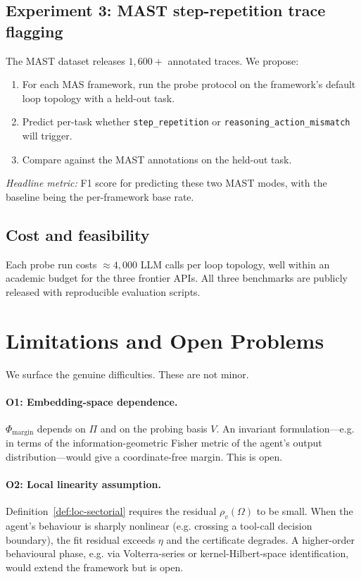 \documentclass[11pt,a4paper]{article}
\theoremstyle{definition}
\theoremstyle{remark}
\newcommand{\PhaseMargin}{\Phi_{\mathrm{margin}}}
\begin{document}
\subsection{Experiment 3: MAST step-repetition trace flagging}\label{ssec:exp-mast}

The MAST dataset \citep{Cemri2025MAST} releases $1{,}600+$ annotated traces.
We propose:
\begin{enumerate}[leftmargin=*]
\item For each MAS framework, run the probe protocol on the framework's
default loop topology with a held-out task.
\item Predict per-task whether \texttt{step\_repetition} or
\texttt{reasoning\_action\_mismatch} will trigger.
\item Compare against the MAST annotations on the held-out task.
\end{enumerate}
\textit{Headline metric:} F1 score for predicting these two MAST modes,
with the baseline being the per-framework base rate.

\subsection{Cost and feasibility}\label{ssec:cost-feasibility}

Each probe run costs $\approx 4{,}000$ LLM calls per loop topology, well
within an academic budget for the three frontier APIs.  All three
benchmarks are publicly released with reproducible evaluation scripts.

\section{Limitations and Open Problems}\label{sec:open}

We surface the genuine difficulties.  These are not minor.

\paragraph{O1: Embedding-space dependence.}  $\PhaseMargin$ depends on
$\Pi$ and on the probing basis $V$.  An invariant formulation---e.g.
in terms of the information-geometric Fisher metric of the agent's
output distribution---would give a coordinate-free margin.  This is
open.

\paragraph{O2: Local linearity assumption.}  Definition~\ref{def:loc-sectorial}
requires the residual $\rho_{v}(\Omega)$ to be small.  When the agent's
behaviour is sharply nonlinear (e.g. crossing a tool-call decision
boundary), the fit residual exceeds $\eta$ and the certificate
degrades.  A higher-order behavioural phase, e.g. via Volterra-series or
kernel-Hilbert-space identification, would extend the framework but is
open.
\end{document}
